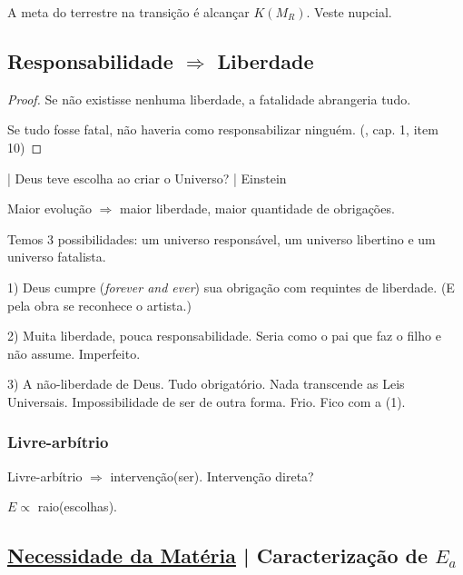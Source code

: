\documentclass[12pt,a4paper]{article}
\begin{document}
			A meta do terrestre na transi\c{c}\~ao \'e alcan\c{c}ar $K(M_R)$. Veste nupcial\cite{batista}.

		\subsection{Responsabilidade $\Rightarrow$ Liberdade}\label{respLib}
			\begin{flushright}
			\end{flushright}

			\begin{proof}
				Se n\~ao existisse nenhuma liberdade, a fatalidade abrangeria tudo.

				Se tudo fosse fatal, n\~ao haveria como responsabilizar ningu\'em.	(\cite{ceuinf}, cap. 1, item 10)
			\end{proof}

| Deus teve escolha ao criar o Universo? | Einstein

Maior evolu\c{c}\~ao $\Rightarrow$ maior liberdade, maior quantidade de obriga\c{c}\~oes.

Temos 3 possibilidades: um universo respons\'avel, um universo libertino e um universo fatalista.

1) Deus cumpre (\emph{forever and ever}) sua obriga\c{c}\~ao com requintes de liberdade. (E pela obra se reconhece o artista.)

2) Muita liberdade, pouca responsabilidade. Seria como o pai que faz o filho e n\~ao assume. Imperfeito.

3) A n\~ao-liberdade de Deus. Tudo obrigat\'orio. Nada transcende as Leis Universais. Impossibilidade de ser de outra forma.
Frio. Fico com a (1).

		\subsubsection{Livre-arb\'itrio}
			\begin{flushright}
			\end{flushright}

			Livre-arb\'itrio $\Rightarrow$ interven\c{c}\~ao(ser). Interven\c{c}\~ao direta?

			$E \propto$ raio(escolhas).

		\subsection{\underline{Necessidade da Mat\'eria} | Caracteriza\c{c}\~ao de $ E_a $}\label{materializacao}
			\begin{flushright}
			\end{flushright}
\end{document}
